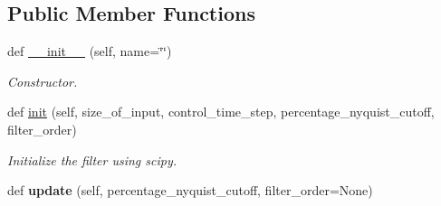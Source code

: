 \subsection*{Public Member Functions}
\begin{DoxyCompactItemize}
\item 
def \hyperlink{classpython_1_1dg__tools_1_1filter_1_1ButterWorthFilter_ac9534f4a0ab7b60766183e3351093054}{\+\_\+\+\_\+init\+\_\+\+\_\+} (self, name=\char`\"{}\char`\"{})
\begin{DoxyCompactList}\small\item\em Constructor. \end{DoxyCompactList}\item 
def \hyperlink{classpython_1_1dg__tools_1_1filter_1_1ButterWorthFilter_a483e952c69af10e7c4c5d4b776c92c29}{init} (self, size\+\_\+of\+\_\+input, control\+\_\+time\+\_\+step, percentage\+\_\+nyquist\+\_\+cutoff, filter\+\_\+order)
\begin{DoxyCompactList}\small\item\em Initialize the filter using scipy. \end{DoxyCompactList}\item 
def {\bfseries update} (self, percentage\+\_\+nyquist\+\_\+cutoff, filter\+\_\+order=None)\hypertarget{classpython_1_1dg__tools_1_1filter_1_1ButterWorthFilter_ab103d1b24b289d2236ca0be5f601f7bc}{}\label{classpython_1_1dg__tools_1_1filter_1_1ButterWorthFilter_ab103d1b24b289d2236ca0be5f601f7bc}

\end{DoxyCompactItemize}
